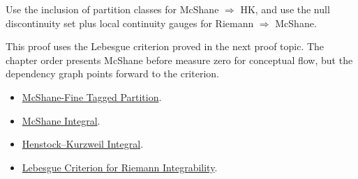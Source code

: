 \begin{remark*}
Use the inclusion of partition classes for McShane \(\Rightarrow\) HK, and use
the null discontinuity set plus local continuity gauges for
Riemann \(\Rightarrow\) McShane.
\end{remark*}
\begin{remark*}
This proof uses the Lebesgue criterion proved in the next proof topic. The
chapter order presents McShane before measure zero for conceptual flow, but
the dependency graph points forward to the criterion.
\end{remark*}
\begin{dependencies}
\begin{itemize}
  \item \hyperref[def:mcshane-fine-tagged-partition]{McShane-Fine Tagged Partition}.
  \item \hyperref[def:mcshane-integral]{McShane Integral}.
  \item \hyperref[def:henstock-kurzweil-integral]{Henstock--Kurzweil Integral}.
  \item \hyperref[thm:lebesgue-criterion-riemann-integrability]{Lebesgue Criterion for Riemann Integrability}.
\end{itemize}
\end{dependencies}
\clearpage
